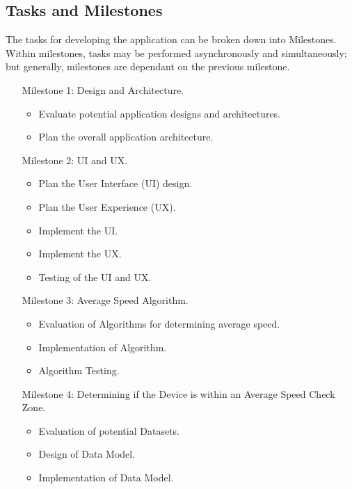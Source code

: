 \documentclass[11pt, a4paper, notitlepage]{report}
\begin{document}
\subsection{Tasks and Milestones}
The tasks for developing the application can be broken down into Milestones. 
Within milestones, tasks may be performed asynchronously and simultaneously; 
but generally, milestones are dependant on the previous milestone.

\begin{enumerate}
    \item [Milestone 1:]Design and Architecture.
    \begin{itemize}
        \item Evaluate potential application designs and architectures.
        \item Plan the overall application architecture.
    \end{itemize}
    \item [Milestone 2:]UI and UX.
    \begin{itemize}
        \item Plan the User Interface (UI) design.
        \item Plan the User Experience (UX).
        \item Implement the UI.
        \item Implement the UX.
        \item Testing of the UI and UX.
    \end{itemize}
    \item [Milestone 3:]Average Speed Algorithm.
    \begin{itemize}
        \item Evaluation of Algorithms for determining average speed.
        \item Implementation of Algorithm.
        \item Algorithm Testing.
    \end{itemize}
    \item [Milestone 4:]Determining if the Device is within an Average Speed Check Zone.
    \begin{itemize}
        \item Evaluation of potential Datasets.
        \item Design of Data Model.
        \item Implementation of Data Model.
    \end{itemize}

\end{enumerate}
\end{document}
